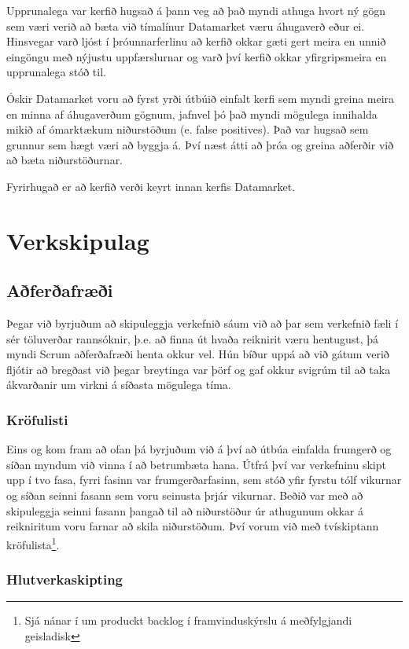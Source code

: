 \documentclass{article}
\begin{document}
Upprunalega var kerfið hugsað á þann veg að það myndi athuga hvort ný gögn sem
væri verið að bæta við tímalínur Datamarket væru áhugaverð eður ei. Hinsvegar
varð ljóst í þróunnarferlinu að kerfið okkar gæti gert meira en unnið
eingöngu með nýjustu uppfærslurnar og varð því kerfið okkar yfirgripsmeira en
upprunalega stóð til.

Óskir Datamarket voru að fyrst yrði útbúið einfalt kerfi 
sem myndi greina meira en minna af áhugaverðum gögnum, jafnvel þó það myndi
mögulega 
innihalda mikið af ómarktækum niðurstöðum (e. false positives). Það var hugsað
sem 
grunnur sem hægt væri að byggja á. Því næst átti að þróa og greina aðferðir við
að 
bæta niðurstöðurnar. 

Fyrirhugað er að kerfið verði keyrt innan kerfis Datamarket.
\newpage

\section{Verkskipulag}


\subsection{Aðferðafræði}

Þegar við byrjuðum að skipuleggja verkefnið sáum við að þar sem verkefnið 
fæli í sér töluverðar rannsóknir, þ.e. að finna út hvaða reiknirit væru hentugust, 
þá myndi Scrum aðferðafræði henta okkur vel. 
Hún bíður uppá að við gátum verið fljótir að bregðast við þegar breytinga var þörf og 
gaf okkur svigrúm til að taka ákvarðanir um virkni á síðasta mögulega tíma.
\subsubsection{Kröfulisti}
Eins og kom fram að ofan þá byrjuðum við á því að útbúa einfalda frumgerð 
og síðan myndum við vinna í að betrumbæta hana. 
Útfrá því var verkefninu skipt upp í tvo fasa, fyrri 
fasinn var frumgerðarfasinn, sem stóð yfir fyrstu tólf vikurnar og síðan seinni fasann sem voru 
seinusta þrjár vikurnar. Beðið var með að skipuleggja seinni fasann þangað til að niðurstöður úr 
athugunum okkar á reikniritum voru farnar að skila niðurstöðum. 
Því vorum við með tvískiptann kröfulista\footnote[1]{Sjá nánar í 
um produckt backlog í framvinduskýrslu á meðfylgjandi geisladisk}.

\subsubsection{Hlutverkaskipting}
\end{document}
